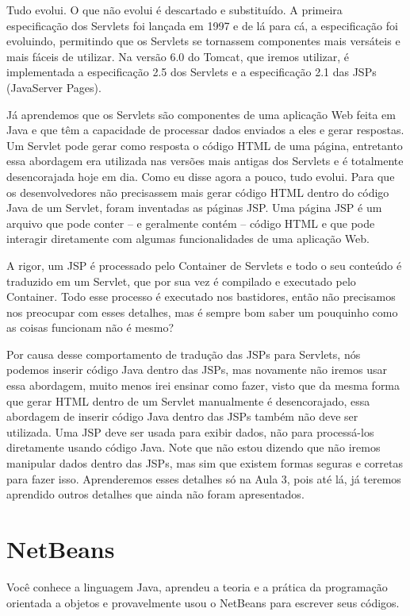 Tudo evolui. O que não evolui é descartado e substituído. A primeira especificação dos Servlets foi lançada em 1997 e de lá para cá, a especificação foi evoluindo, permitindo que os Servlets se tornassem componentes mais versáteis e mais fáceis de utilizar. Na versão 6.0 do Tomcat, que iremos utilizar, é implementada a especificação 2.5 dos Servlets e a especificação 2.1 das JSPs (JavaServer Pages).

Já aprendemos que os Servlets são componentes de uma aplicação Web feita em Java e que têm a capacidade de processar dados enviados a eles e gerar respostas. Um Servlet pode gerar como resposta o código HTML de uma página, entretanto essa abordagem era utilizada nas versões mais antigas dos Servlets e é totalmente desencorajada hoje em dia. Como eu disse agora a pouco, tudo evolui. Para que os desenvolvedores não precisassem mais gerar código HTML dentro do código Java de um Servlet, foram inventadas as páginas JSP. Uma página JSP é um arquivo que pode conter – e geralmente contém – código HTML e que pode interagir diretamente com algumas funcionalidades de uma aplicação Web.

A rigor, um JSP é processado pelo Container de Servlets e todo o seu conteúdo é traduzido em um Servlet, que por sua vez é compilado e executado pelo Container. Todo esse processo é executado nos bastidores, então não precisamos nos preocupar com esses detalhes, mas é sempre bom saber um pouquinho como as coisas funcionam não é mesmo?

Por causa desse comportamento de tradução das JSPs para Servlets, nós podemos inserir código Java dentro das JSPs, mas novamente não iremos usar essa abordagem, muito menos irei ensinar como fazer, visto que da mesma forma que gerar HTML dentro de um Servlet manualmente é desencorajado, essa abordagem de inserir código Java dentro das JSPs também não deve ser utilizada. Uma JSP deve ser usada para exibir dados, não para processá-los diretamente usando código Java. Note que não estou dizendo que não iremos manipular dados dentro das JSPs, mas sim que existem formas seguras e corretas para fazer isso. Aprenderemos esses detalhes só na Aula 3, pois até lá, já teremos aprendido outros detalhes que ainda não foram apresentados.


\section{NetBeans}

Você conhece a linguagem Java, aprendeu a teoria e a prática da programação orientada a objetos e provavelmente usou o NetBeans para escrever seus códigos.

